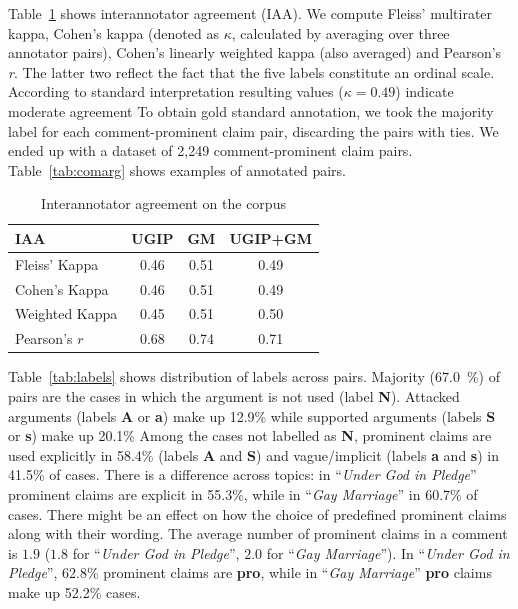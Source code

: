 Table~\ref{tab:iaa} shows interannotator agreement (IAA). 
We compute Fleiss' multirater kappa, Cohen's kappa (denoted as $\kappa$, calculated by
averaging over three annotator pairs), Cohen's linearly weighted kappa (also
averaged) and Pearson's \textit{r}.
The latter two reflect the fact that the five labels constitute an ordinal scale. 
According to standard interpretation \citep{landis1977measurement} resulting
values ($\kappa = 0.49$) indicate moderate agreement 
To obtain gold standard annotation, we took the majority label for 
each comment-prominent claim pair, discarding the pairs with ties. 
We ended up with a dataset of 2,249 comment-prominent claim pairs. 
Table~\ref{tab:comarg} shows examples of annotated pairs. 

\begin{table}
\centering
{\small
\begin{tabular}{l ccc}
\toprule
IAA & UGIP & GM & UGIP+GM \\
\midrule
Fleiss' Kappa    & 0.46 & 0.51 & 0.49 \\
Cohen's Kappa    & 0.46 & 0.51 & 0.49 \\
Weighted Kappa   & 0.45 & 0.51 &  0.50\\
Pearson's $r$    & 0.68 & 0.74 &  0.71 \\
\bottomrule
\end{tabular}}
\caption{Interannotator agreement on the \ComArg corpus}
\label{tab:iaa}
\end{table}


Table~\ref{tab:labels} shows distribution of labels across pairs. 
Majority (67.0~\%) of pairs are the cases in which the argument is not used
(label \textbf{N}).
Attacked arguments (labels \textbf{A} or \textbf{a}) make up 12.9\% while supported
arguments (labels \textbf{S} or \textbf{s}) make up 20.1\%
Among the cases not labelled as \textbf{N}, prominent claims are used explicitly 
in 58.4\% (labels \textbf{A} and \textbf{S}) and vague/implicit (labels \textbf{a} and \textbf{s})
in 41.5\% of cases. 
There is a difference across topics: in ``\emph{Under God in Pledge}''
prominent claims are explicit in 55.3\%, while in 
``\emph{Gay Marriage}'' in 60.7\% of cases. 
There might be an effect on how the choice of predefined prominent claims along with their 
wording.  
The average number of prominent claims in a comment is $1.9$ ($1.8$ for 
``\emph{Under God in Pledge}'', $2.0$ for ``\emph{Gay Marriage}''). 
In ``\emph{Under God in Pledge}'', 62.8\% prominent claims are \textbf{pro},
while in ``\emph{Gay Marriage}'' \textbf{pro} claims 
make up 52.2\% cases. 

